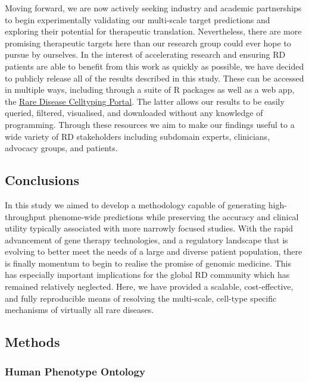 \documentclass[
]{article}
\begin{document}
Moving forward, we are now actively seeking industry and academic
partnerships to begin experimentally validating our multi-scale target
predictions and exploring their potential for therapeutic translation.
Nevertheless, there are more promising therapeutic targets here than our
research group could ever hope to pursue by ourselves. In the interest
of accelerating research and ensuring RD patients are able to benefit
from this work as quickly as possible, we have decided to publicly
release all of the results described in this study. These can be
accessed in multiple ways, including through a suite of R packages as
well as a web app, the
\href{https://neurogenomics.github.io/rare_disease_celltyping_apps/home/}{Rare
Disease Celltyping Portal}. The latter allows our results to be easily
queried, filtered, visualised, and downloaded without any knowledge of
programming. Through these resources we aim to make our findings useful
to a wide variety of RD stakeholders including subdomain experts,
clinicians, advocacy groups, and patients.

\subsection{Conclusions}\label{sec-conclusions}

In this study we aimed to develop a methodology capable of generating
high-throughput phenome-wide predictions while preserving the accuracy
and clinical utility typically associated with more narrowly focused
studies. With the rapid advancement of gene therapy technologies, and a
regulatory landscape that is evolving to better meet the needs of a
large and diverse patient population, there is finally momentum to begin
to realise the promise of genomic medicine. This has especially
important implications for the global RD community which has remained
relatively neglected. Here, we have provided a scalable, cost-effective,
and fully reproducible means of resolving the multi-scale, cell-type
specific mechanisms of virtually all rare diseases.

\subsection{Methods}\label{sec-methods}

\subsubsection{Human Phenotype Ontology}\label{human-phenotype-ontology}
\end{document}
